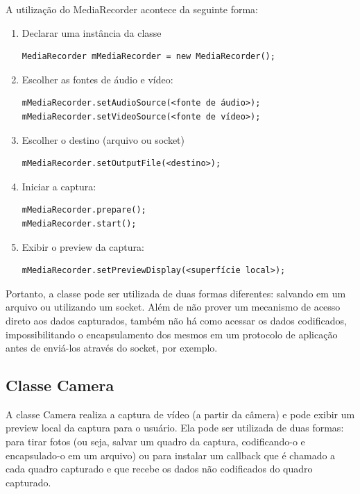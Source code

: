 \documentclass{acm_proc_article-sp}
\begin{document}
A utilização do MediaRecorder acontece da seguinte forma:
\begin{enumerate}
 \item Declarar uma instância da classe
  \begin{verbatim}
MediaRecorder mMediaRecorder = new MediaRecorder();
  \end{verbatim}
 \item Escolher as fontes de áudio e vídeo:
  \begin{verbatim}
mMediaRecorder.setAudioSource(<fonte de áudio>);
mMediaRecorder.setVideoSource(<fonte de vídeo>);
  \end{verbatim}
 \item Escolher o destino (arquivo ou socket)
  \begin{verbatim}
mMediaRecorder.setOutputFile(<destino>);
  \end{verbatim}
 \item Iniciar a captura:
  \begin{verbatim}
mMediaRecorder.prepare();
mMediaRecorder.start();
  \end{verbatim}
 \item Exibir o preview da captura:
  \begin{verbatim}
mMediaRecorder.setPreviewDisplay(<superfície local>);
  \end{verbatim}
\end{enumerate}

Portanto, a classe pode ser utilizada de duas formas diferentes: salvando em um arquivo ou utilizando um socket. Além de não prover um mecanismo de acesso direto aos dados capturados, também não há como acessar os dados codificados, impossibilitando o encapsulamento dos mesmos em um protocolo de aplicação antes de enviá-los através do socket, por exemplo. 

\subsection{Classe Camera}
A classe Camera realiza a captura de vídeo (a partir da câmera) e pode exibir um preview local da captura para o usuário. Ela pode ser utilizada de duas formas: para tirar fotos (ou seja, salvar um quadro da captura, codificando-o e encapsulado-o em um arquivo) ou para instalar um callback que é chamado a cada quadro capturado e que recebe os dados não codificados do quadro capturado.

\end{document}
